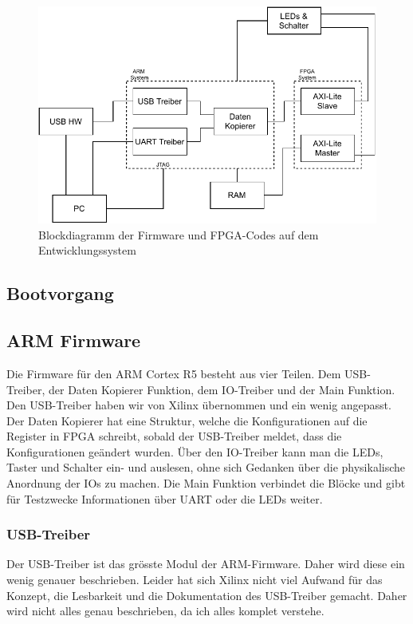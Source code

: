 \documentclass{article}
\begin{document}
\begin{figure}[tb]
    \includegraphics[width=\linewidth]{drawio/bd_firmware_pe1}
    \caption{Blockdiagramm der Firmware und FPGA-Codes auf dem Entwicklungssystem}
    \label{fig:bd_firmware_pe1}
\end{figure}

\subsection{Bootvorgang}



\subsection{ARM Firmware}
Die Firmware für den ARM Cortex R5 besteht aus vier Teilen. Dem USB-Treiber, der Daten Kopierer Funktion, dem IO-Treiber und der Main Funktion. Den USB-Treiber haben wir von Xilinx übernommen und ein wenig angepasst. Der Daten Kopierer hat eine Struktur, welche die Konfigurationen auf die Register in FPGA schreibt, sobald der USB-Treiber meldet, dass die Konfigurationen geändert wurden. Über den IO-Treiber kann man die LEDs, Taster und Schalter ein- und auslesen, ohne sich Gedanken über die physikalische Anordnung der IOs zu machen. Die Main Funktion verbindet die Blöcke und gibt für Testzwecke Informationen über UART oder die LEDs weiter.

\subsubsection*{USB-Treiber}
Der USB-Treiber ist das grösste Modul der ARM-Firmware. Daher wird diese ein wenig genauer beschrieben. Leider hat sich Xilinx nicht viel Aufwand für das Konzept, die Lesbarkeit und die Dokumentation des USB-Treiber gemacht. Daher wird nicht alles genau beschrieben, da ich alles komplet verstehe.
\end{document}
